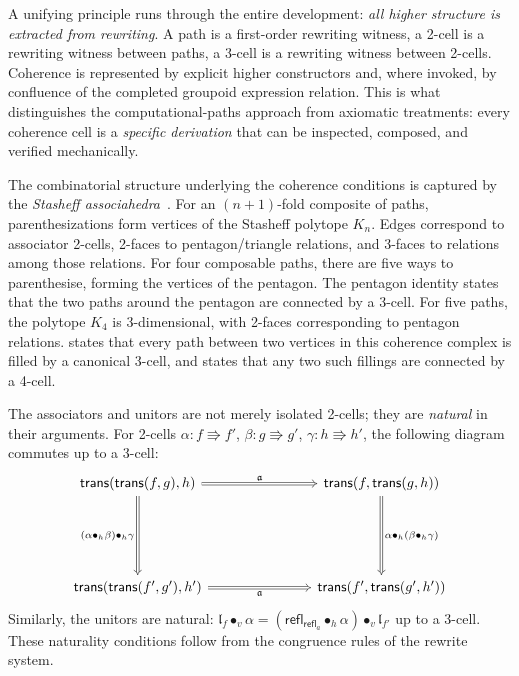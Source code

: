 \documentclass[manuscript]{BSLstyle}
\newcommand{\refl}{\mathsf{refl}}
\newcommand{\trans}{\mathsf{trans}}
\begin{document}
\begin{remark}\label{rem:guiding-principle}
A unifying principle runs through the entire development: \emph{all
higher structure is extracted from rewriting}.  A path is a first-order
rewriting witness, a 2-cell is a rewriting witness between paths, a
3-cell is a rewriting witness between 2-cells.  Coherence is represented by
explicit higher constructors and, where invoked, by confluence of the
completed groupoid expression relation.  This is what distinguishes the
computational-paths approach from axiomatic treatments: every coherence
cell is a \emph{specific derivation} that can be inspected, composed,
and verified mechanically.
\end{remark}

\begin{remark}
The combinatorial structure underlying the coherence conditions is
captured by the \emph{Stasheff associahedra}~\cite{Stasheff63}.
For an $(n+1)$-fold composite of paths, parenthesizations form vertices
of the Stasheff polytope $K_n$.  Edges correspond to associator 2-cells,
2-faces to pentagon/triangle relations, and 3-faces to relations among
those relations.  For four composable paths, there are five ways to
parenthesise, forming the vertices of the pentagon.  The pentagon identity
states that the two paths around the pentagon are connected by a 3-cell.
For five paths, the polytope $K_4$ is 3-dimensional, with 2-faces
corresponding to pentagon relations.
 states that every path between two vertices
in this coherence complex is filled by a canonical 3-cell, and
 states that any two such fillings are connected
by a 4-cell.
\end{remark}

\begin{remark}\label{rem:naturality}
The associators and unitors are not merely isolated 2-cells; they are
\emph{natural} in their arguments.  For 2-cells
$\alpha : f \Rrightarrow f'$, $\beta : g \Rrightarrow g'$,
$\gamma : h \Rrightarrow h'$, the following diagram commutes up to
a 3-cell:
\[
\begin{tikzcd}[column sep=2.6cm, row sep=2cm]
\trans(\trans(f,g),h)
  \ar[r, Rightarrow, "\mathfrak{a}"]
  \ar[d, Rightarrow, "{(\alpha \bullet_h \beta) \bullet_h \gamma}"']
& \trans(f,\trans(g,h))
  \ar[d, Rightarrow, "{\alpha \bullet_h (\beta \bullet_h \gamma)}"]
\\
\trans(\trans(f',g'),h')
  \ar[r, Rightarrow, "\mathfrak{a}"']
& \trans(f',\trans(g',h'))
\end{tikzcd}
\]
Similarly, the unitors are natural:
$\mathfrak{l}_f \bullet_v \alpha = (\refl_{\refl_a} \bullet_h \alpha) \bullet_v \mathfrak{l}_{f'}$
up to a 3-cell.  These naturality conditions follow from the congruence
rules of the rewrite system.
\end{remark}
\end{document}
